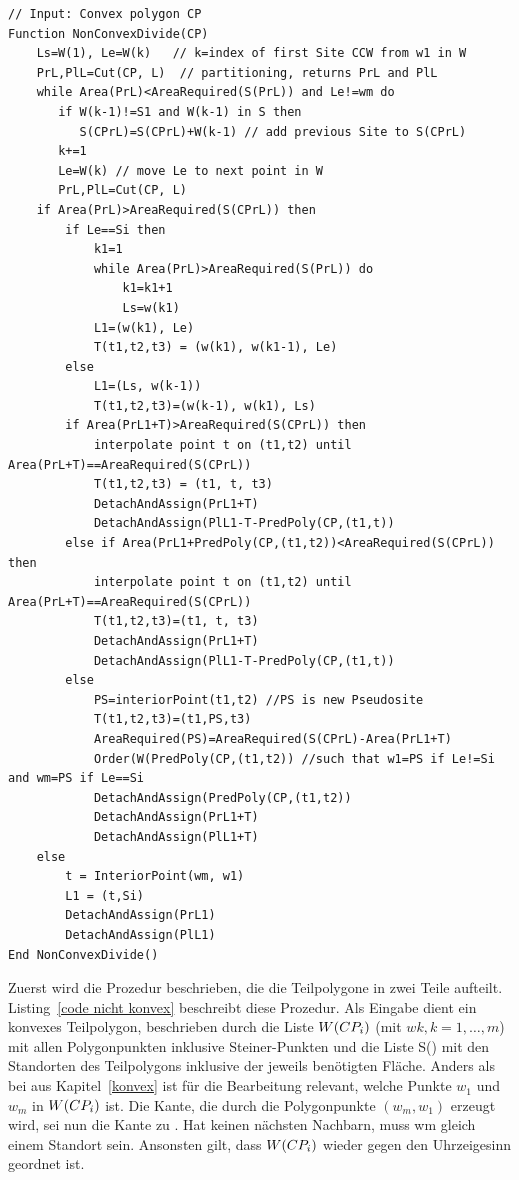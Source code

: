 \documentclass[ngerman]{seminarbeitrag}
\begin{document}
\begin{lstlisting}[float,caption={Der Algorithmus \noncon}, frame=single, label=code nicht konvex,breaklines=true,breakatwhitespace=true]
// Input: Convex polygon CP
Function NonConvexDivide(CP)
    Ls=W(1), Le=W(k)   // k=index of first Site CCW from w1 in W
    PrL,PlL=Cut(CP, L)  // partitioning, returns PrL and PlL
    while Area(PrL)<AreaRequired(S(PrL)) and Le!=wm do
       if W(k-1)!=S1 and W(k-1) in S then 
          S(CPrL)=S(CPrL)+W(k-1) // add previous Site to S(CPrL)
       k+=1
       Le=W(k) // move Le to next point in W
       PrL,PlL=Cut(CP, L)
    if Area(PrL)>AreaRequired(S(CPrL)) then
        if Le==Si then
            k1=1
            while Area(PrL)>AreaRequired(S(PrL)) do
                k1=k1+1
                Ls=w(k1)
            L1=(w(k1), Le)
            T(t1,t2,t3) = (w(k1), w(k1-1), Le)
        else
            L1=(Ls, w(k-1))
            T(t1,t2,t3)=(w(k-1), w(k1), Ls)
        if Area(PrL1+T)>AreaRequired(S(CPrL)) then
            interpolate point t on (t1,t2) until Area(PrL+T)==AreaRequired(S(CPrL))
            T(t1,t2,t3) = (t1, t, t3)
            DetachAndAssign(PrL1+T)
            DetachAndAssign(PlL1-T-PredPoly(CP,(t1,t))
        else if Area(PrL1+PredPoly(CP,(t1,t2))<AreaRequired(S(CPrL)) then
            interpolate point t on (t1,t2) until Area(PrL+T)==AreaRequired(S(CPrL))
            T(t1,t2,t3)=(t1, t, t3)
            DetachAndAssign(PrL1+T)
            DetachAndAssign(PlL1-T-PredPoly(CP,(t1,t))
        else
            PS=interiorPoint(t1,t2) //PS is new Pseudosite
            T(t1,t2,t3)=(t1,PS,t3)
            AreaRequired(PS)=AreaRequired(S(CPrL)-Area(PrL1+T)
            Order(W(PredPoly(CP,(t1,t2)) //such that w1=PS if Le!=Si and wm=PS if Le==Si
            DetachAndAssign(PredPoly(CP,(t1,t2))
            DetachAndAssign(PrL1+T)
            DetachAndAssign(PlL1+T)
    else
        t = InteriorPoint(wm, w1)
        L1 = (t,Si)
        DetachAndAssign(PrL1)
        DetachAndAssign(PlL1)
End NonConvexDivide() 

\end{lstlisting}

Zuerst wird die Prozedur \noncon beschrieben, die die Teilpolygone in zwei Teile aufteilt. Listing~\ref{code nicht konvex} beschreibt diese Prozedur.
Als Eingabe dient ein konvexes Teilpolygon, beschrieben durch die Liste $W(CP_{i})$ (mit $w{k}, k = 1,…,m$) mit allen Polygonpunkten inklusive Steiner-Punkten und die Liste S(\cpi) mit den Standorten des Teilpolygons inklusive der jeweils benötigten Fläche. Anders als bei \con aus Kapitel~\ref{konvex} ist für die Bearbeitung relevant, welche Punkte $w_{1}$ und $w_{m}$ in $W(CP_{i})$ ist. Die Kante, die durch die Polygonpunkte $(w_{m}, w_{1})$ erzeugt wird, sei nun die Kante zu \next{\mcpi}. Hat \cpi keinen nächsten Nachbarn, muss wm gleich einem Standort sein. Ansonsten gilt, dass $W(CP_{i})$ wieder gegen den Uhrzeigesinn geordnet ist.\\
\end{document}

